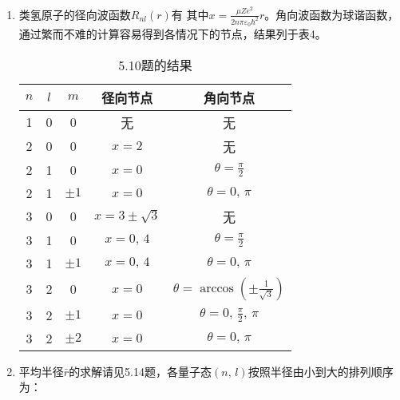 \begin{enumerate}[label=\textbf{5.\arabic*}, listparindent=\parindent, leftmargin=-0.5mm]
\item 类氢原子的径向波函数$R_{nl}(r)$有
其中$x=\frac{\mu Ze^2}{2n\pi\varepsilon_0\hbar^2}r$。角向波函数为球谐函数，
通过繁而不难的计算容易得到各情况下的节点，结果列于表4。
\begin{table}[h]
    \centering
    \begin{tabular}{ccc|c|c}
    \hline
        $n$ & $l$ & $m$ & 径向节点 & 角向节点 \\
        \hline
        1 & 0 & 0 & 无 & 无 \\
        \hline
        2 & 0 & 0 & $x=2$ & 无 \\
        2 & 1 & 0 & $x=0$ & $\theta=\frac{\pi}{2}$ \\
        2 & 1 & $\pm1$ & $x=0$ & $\theta=0,\,\pi$ \\
        \hline
        3 & 0 & 0 & $x=3\pm\sqrt{3}$ & 无 \\
        3 & 1 & 0 & $x=0,\,4$ & $\theta=\frac{\pi}{2}$ \\
        3 & 1 & $\pm1$ & $x=0,\,4$ & $\theta=0,\,\pi$ \\
        \hline
        3 & 2 & 0 & $x=0$ & $\theta=\arccos(\pm\frac{1}{\sqrt{3}})$ \\
        3 & 2 & $\pm1$ & $x=0$ & $\theta=0,\,\frac{\pi}{2},\,\pi$ \\
        3 & 2 & $\pm2$ & $x=0$ & $\theta=0,\,\pi$\\
        \hline
    \end{tabular}
    \caption{5.10题的结果}
    \label{tab:my_label}
\end{table}

\item 平均半径$\bar{r}$的求解请见5.14题，各量子态$(n,\,l)$按照半径由小到大的排列顺序为：


\end{enumerate}

